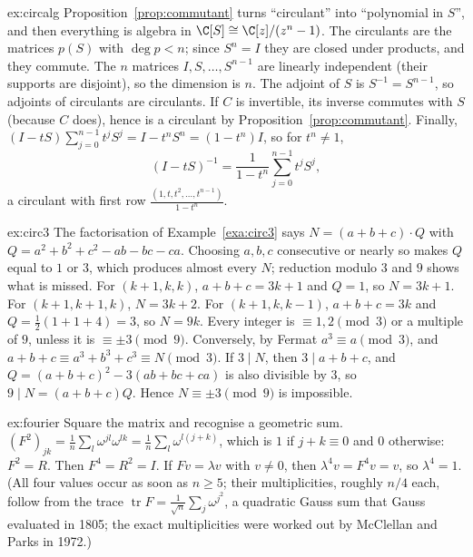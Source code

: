 \begin{solution}{ex:circalg}
\idea Proposition~\ref{prop:commutant} turns ``circulant'' into ``polynomial in $S$'', and then everything is algebra in
$\C[S]\cong\C[z]/(z^n-1)$.
\writeup The circulants are the matrices $p(S)$ with $\deg p<n$; since $S^n=I$ they are closed under products, and they commute.
The $n$ matrices $I,S,\dots,S^{n-1}$ are linearly independent (their supports are disjoint), so the dimension is $n$. The adjoint of
$S$ is $S^{-1}=S^{n-1}$, so adjoints of circulants are circulants. If $C$ is invertible, its inverse commutes with $S$ (because $C$
does), hence is a circulant by Proposition~\ref{prop:commutant}. Finally, $(I-tS)\sum_{j=0}^{n-1}t^jS^j=I-t^nS^n=(1-t^n)I$, so for
$t^n\ne1$,
\[
(I-tS)^{-1}=\frac1{1-t^n}\sum_{j=0}^{n-1}t^jS^j,
\]
a circulant with first row $\frac{(1,t,t^2,\dots,t^{n-1})}{1-t^n}$.
\end{solution}

\begin{solution}{ex:circ3}
\idea The factorisation of Example~\ref{exa:circ3} says $N=(a+b+c)\cdot Q$ with $Q=a^2+b^2+c^2-ab-bc-ca$. Choosing $a,b,c$
consecutive or nearly so makes $Q$ equal to $1$ or $3$, which produces almost every $N$; reduction modulo $3$ and $9$ shows what is
missed.
\writeup For $(k+1,k,k)$, $a+b+c=3k+1$ and $Q=1$, so $N=3k+1$. For $(k+1,k+1,k)$, $N=3k+2$. For $(k+1,k,k-1)$, $a+b+c=3k$ and $Q=
\frac12(1+1+4)=3$, so $N=9k$. Every integer is $\equiv1,2\pmod3$ or a multiple of $9$, unless it is $\equiv\pm3\pmod9$. Conversely, by
Fermat $a^3\equiv a\pmod3$, and $a+b+c\equiv a^3+b^3+c^3\equiv N\pmod3$. If $3\mid N$, then $3\mid a+b+c$, and
$Q=(a+b+c)^2-3(ab+bc+ca)$ is also divisible by $3$, so $9\mid N=(a+b+c)Q$. Hence $N\equiv\pm3\pmod9$ is impossible.
\end{solution}

\begin{solution}{ex:fourier}
\idea Square the matrix and recognise a geometric sum.
\writeup $(F^2)_{jk}=\frac1n\sum_l\omega^{jl}\omega^{lk}=\frac1n\sum_l\omega^{l(j+k)}$, which is $1$ if $j+k\equiv0$ and $0$ otherwise:
$F^2=R$. Then $F^4=R^2=I$. If $Fv=\lambda v$ with $v\ne0$, then $\lambda^4v=F^4v=v$, so $\lambda^4=1$. (All four values occur as soon as
$n\ge5$; their multiplicities, roughly $n/4$ each, follow from the trace $\operatorname{tr}F=\frac1{\sqrt n}\sum_j\omega^{j^2}$,
a quadratic Gauss sum that Gauss evaluated in 1805; the exact multiplicities were worked out by McClellan and Parks in 1972.)
\end{solution}

